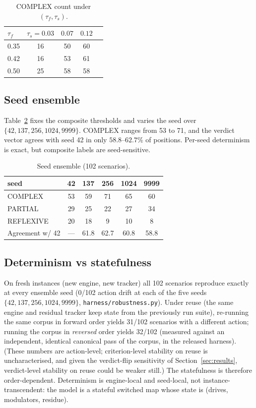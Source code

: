 \documentclass[journal]{IEEEtran}
\newcommand{\pct}{\%}
\begin{document}
\begin{table}[h]
\centering
\caption{COMPLEX count under $(\tau_f,\tau_s)$.}
\label{tab:grid}
\begin{tabular}{lcccc}
\toprule
$\tau_f$ & $\tau_s{=}0.03$ & $0.07$ & $0.12$ \\
\midrule
0.35 & 16 & 50 & 60 \\
0.42 & 16 & 53 & 61 \\
0.50 & 25 & 58 & 58 \\
\bottomrule
\end{tabular}
\end{table}

\subsection{Seed ensemble}
Table~\ref{tab:seed} fixes the composite thresholds and varies the
seed over $\{42,137,256,1024,9999\}$. COMPLEX ranges from 53 to 71,
and the verdict vector agrees with seed 42 in only $58.8$--$62.7\pct$
of positions. Per-seed determinism is exact, but composite labels
are seed-sensitive.

\begin{table}[h]
\centering
\caption{Seed ensemble (102 scenarios).}
\label{tab:seed}
\begin{tabular}{lccccc}
\toprule
seed & 42 & 137 & 256 & 1024 & 9999 \\
\midrule
COMPLEX & 53 & 59 & 71 & 65 & 60 \\
PARTIAL & 29 & 25 & 22 & 27 & 34 \\
REFLEXIVE & 20 & 18 & 9 & 10 & 8 \\
Agreement w/ 42 & --- & 61.8 & 62.7 & 60.8 & 58.8 \\
\bottomrule
\end{tabular}
\end{table}

\subsection{Determinism vs statefulness}
\label{sec:determinism}
On fresh instances (new engine, new tracker) all 102 scenarios
reproduce exactly at every ensemble seed (0/102 action drift at each of
the five seeds $\{42,137,256,1024,9999\}$,
\texttt{harness/robustness.py}). Under reuse (the same engine and
residual tracker keep state from the previously run suite), re-running
the same corpus in forward order yields 31/102 scenarios with a
different action; running the corpus in \emph{reversed} order yields
32/102 (measured against an independent, identical canonical pass of
the corpus, in the released harness). (These numbers are action-level;
criterion-level stability on
reuse is uncharacterised, and given the verdict-flip sensitivity of
Section~\ref{sec:results}, verdict-level stability on reuse could be
weaker still.) The statefulness is therefore order-dependent. Determinism is
engine-local and seed-local, not instance-transcendent: the model is a
stateful switched map whose state is (drives, modulators, residue).
\end{document}
